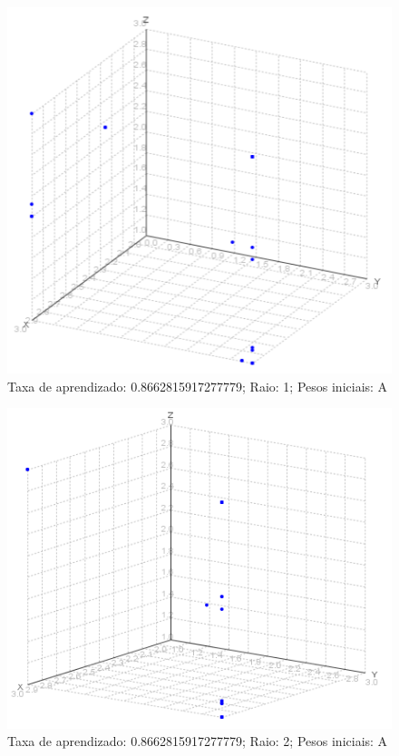 \begin{figure}[ht!]
	\centering
	\includegraphics[scale=0.65]{./imgs/2a1.png}
	\caption{Taxa de aprendizado: 0.8662815917277779; Raio: 1; Pesos iniciais: A}
\end{figure}

\begin{figure}[ht!]
	\centering
	\includegraphics[scale=0.65]{./imgs/2a2.png}
	\caption{Taxa de aprendizado: 0.8662815917277779; Raio: 2; Pesos iniciais: A}
\end{figure}

